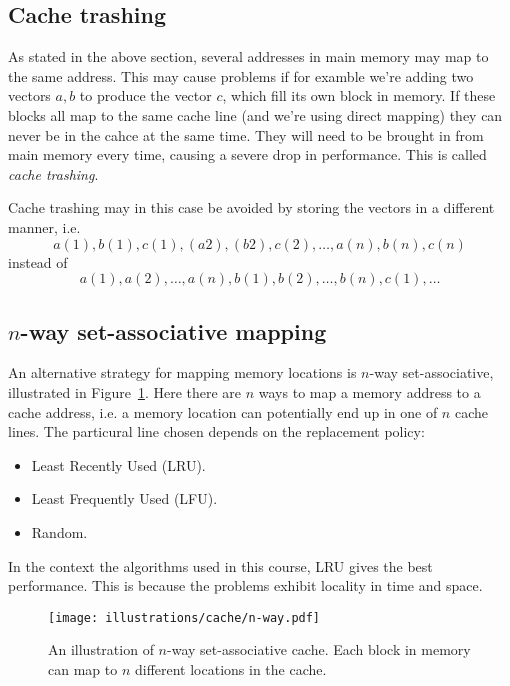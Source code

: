 \subsection{Cache trashing} %
\label{sub:cache_trashing}
As stated in the above section, several addresses in main memory may map to the same address. This may cause problems if for examble we're adding two vectors $a,b$ to produce the vector $c$, which fill its own block in memory. If these blocks all map to the same cache line (and we're using direct mapping) they can never be in the cahce at the same time. They will need to be brought in from main memory every time, causing a severe drop in performance. This is called \emph{cache trashing}.

Cache trashing may in this case be avoided by storing the vectors in a different manner, i.e.
\begin{equation}
\nonumber
  a(1),b(1),c(1),(a2), (b2), c(2), \dots, a(n), b(n), c(n)
\end{equation}
instead of
\begin{equation}
  \nonumber
  a(1),a(2),\dots,a(n),b(1),b(2),\dots, b(n), c(1), \dots
\end{equation}

\subsection{$n$-way set-associative mapping} %
\label{sub:_n_way_associative_mapping}
An alternative strategy for mapping memory locations is $n$-way set-associative, illustrated in Figure~\ref{fig:cache-n-way}. Here there are $n$ ways to map a memory address to a cache address, i.e. a memory location can potentially end up in one of $n$ cache lines. The particural line chosen depends on the replacement policy:
\begin{itemize}
  \item Least Recently Used (LRU).
  \item Least Frequently Used (LFU).
  \item Random.
\end{itemize}
In the context the algorithms used in this course, LRU gives the best performance. This is because the problems exhibit locality in time and space.

\begin{figure}[htbp]
  \centering
  \texttt{[image: illustrations/cache/n-way.pdf]}
  \caption{An illustration of $n$-way set-associative cache. Each block in memory can map to $n$ different locations in the cache.}
  \label{fig:cache-n-way}
\end{figure}

